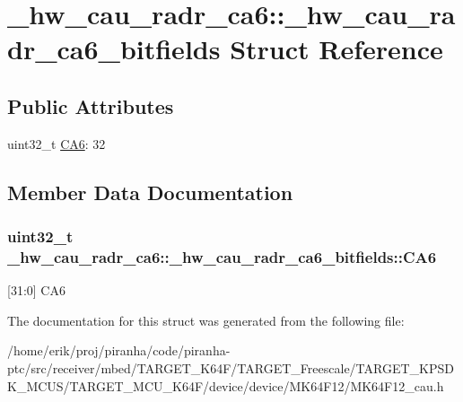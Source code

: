 \hypertarget{struct__hw__cau__radr__ca6_1_1__hw__cau__radr__ca6__bitfields}{}\section{\+\_\+hw\+\_\+cau\+\_\+radr\+\_\+ca6\+:\+:\+\_\+hw\+\_\+cau\+\_\+radr\+\_\+ca6\+\_\+bitfields Struct Reference}
\label{struct__hw__cau__radr__ca6_1_1__hw__cau__radr__ca6__bitfields}
\subsection*{Public Attributes}
\begin{DoxyCompactItemize}
\item 
uint32\+\_\+t \hyperlink{struct__hw__cau__radr__ca6_1_1__hw__cau__radr__ca6__bitfields_a6b3fb8468bd05735c1ff089c172f1832}{C\+A6}\+: 32
\end{DoxyCompactItemize}


\subsection{Member Data Documentation}
\subsubsection[{\texorpdfstring{C\+A6}{CA6}}]{\setlength{\rightskip}{0pt plus 5cm}uint32\+\_\+t \+\_\+hw\+\_\+cau\+\_\+radr\+\_\+ca6\+::\+\_\+hw\+\_\+cau\+\_\+radr\+\_\+ca6\+\_\+bitfields\+::\+C\+A6}\hypertarget{struct__hw__cau__radr__ca6_1_1__hw__cau__radr__ca6__bitfields_a6b3fb8468bd05735c1ff089c172f1832}{}\label{struct__hw__cau__radr__ca6_1_1__hw__cau__radr__ca6__bitfields_a6b3fb8468bd05735c1ff089c172f1832}
\mbox{[}31\+:0\mbox{]} C\+A6 

The documentation for this struct was generated from the following file\+:\begin{DoxyCompactItemize}
\item 
/home/erik/proj/piranha/code/piranha-\/ptc/src/receiver/mbed/\+T\+A\+R\+G\+E\+T\+\_\+\+K64\+F/\+T\+A\+R\+G\+E\+T\+\_\+\+Freescale/\+T\+A\+R\+G\+E\+T\+\_\+\+K\+P\+S\+D\+K\+\_\+\+M\+C\+U\+S/\+T\+A\+R\+G\+E\+T\+\_\+\+M\+C\+U\+\_\+\+K64\+F/device/device/\+M\+K64\+F12/M\+K64\+F12\+\_\+cau.\+h\end{DoxyCompactItemize}
